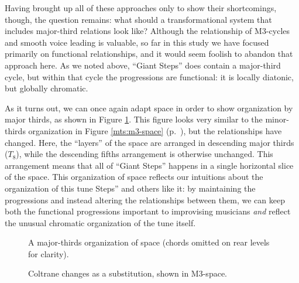 Having brought up all of these approaches only to show their shortcomings,
though, the question remains: what should a transformational system that
includes major-third relations look like? Although the relationship of
M3-cycles and smooth voice leading is valuable, so far in this study we have
focused primarily on functional relationships, and it would seem foolish
to abandon that approach here. As we noted above, ``Giant Steps'' does contain
a major-third cycle, but within that cycle the progressions are functional: it
is locally diatonic, but globally chromatic.

As it turns out, we can once again adapt \tf space in order to show
organization by major thirds, as shown in Figure \ref{maj3:maj3-space}. This
figure looks very similar to the minor-thirds organization in Figure
\ref{mts:m3-space} (p.~\pageref{mts:m3-space}), but the relationships have
changed. Here, the ``layers'' of the space are arranged in
descending major thirds ($T_8$), while the descending fifths arrangement is
otherwise unchanged. This arrangement means that all of ``Giant Steps''
happens in a single horizontal slice of the space.
This organization of \tf space reflects our intuitions about the organization
of this tune Steps'' and others like it: by maintaining the \tfo
progressions and instead altering the relationships between them, we can keep
both the functional progressions important to improvising musicians \emph{and}
reflect the unusual chromatic organization of the tune itself.

\begin{figure}[tbp]
  \caption[A major-thirds organization of \tf space.]{A major-thirds
    organization of \tf space (\ii chords omitted on rear levels for clarity).}
\label{maj3:maj3-space}
\end{figure}

\begin{figure}[tbp]
  \caption{Coltrane changes as a \tfo substitution, shown in M3-space.}
\label{maj3:coltrane-subs-space}
\end{figure}

